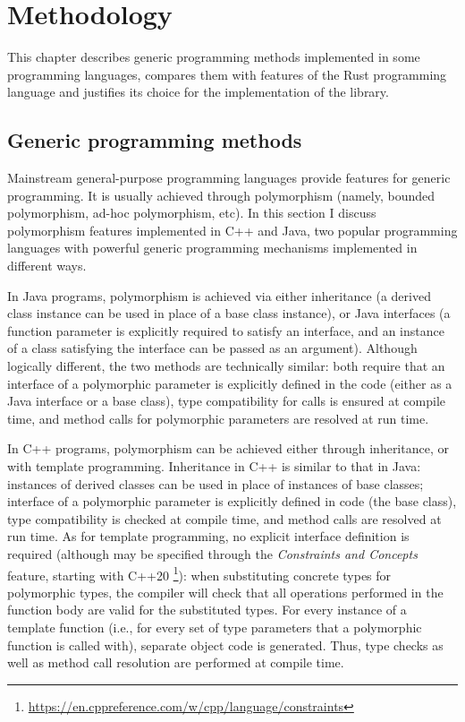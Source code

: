 \chapter{Methodology}
\label{chap:met}

This chapter describes generic programming methods implemented in some programming languages,
compares them with features of the Rust programming language and justifies its choice for
the implementation of the library.

\section{Generic programming methods}


Mainstream general-purpose programming languages provide features for generic programming. It is
usually achieved through polymorphism (namely, bounded polymorphism, ad-hoc polymorphism, etc).
In this section I discuss polymorphism features implemented in C++ and Java, two popular
programming languages with powerful generic programming mechanisms implemented in different ways.

In Java programs, polymorphism is achieved via either inheritance (a derived class instance
can be used in place of a base class instance), or
Java interfaces (a function parameter is explicitly required to satisfy an interface, and an
instance of a class satisfying the interface can be passed as an argument).
Although logically different, the two methods are technically similar: both require that
an interface of a polymorphic parameter is explicitly defined in the code (either as a
Java interface or a base class), type compatibility for calls is ensured at compile time,
and method calls for polymorphic parameters are resolved at run time.

In C++ programs, polymorphism can be achieved either through inheritance, or with template
programming. Inheritance in C++ is similar to that in Java: instances of derived classes can
be used in place of instances of base classes; interface of a polymorphic parameter is
explicitly defined in code (the base class), type compatibility is checked
at compile time, and method calls are resolved at run time. As for template programming,
no explicit interface definition is required (although may be specified through the
\emph{Constraints and Concepts} feature, starting with C++20
\footnote{\url{https://en.cppreference.com/w/cpp/language/constraints}}):
when substituting concrete types for polymorphic types, the compiler will check that all
operations performed in the function body are valid for the substituted types. For every
instance of a template function (i.e., for every set of type parameters that a polymorphic
function is called with), separate object code is generated. Thus, type checks as well as
method call resolution are performed at compile time.

